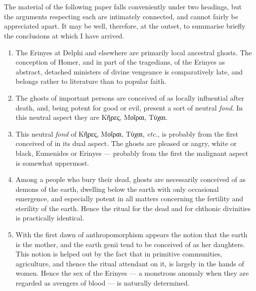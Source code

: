 \documentclass[a4paper, 11pt, oneside, polutonikogreek, english]{article}
\begin{document}
\section*{}
\paragraph{}
The material of the following paper falls conveniently under two headings, but the arguments respecting each are intimately connected, and cannot fairly be appreciated apart. It may be well, therefore, at the outset, to summarise briefly the conclusions at which I have arrived.
\begin{enumerate}
    \item The Erinyes at Delphi and elsewhere are primarily local ancestral ghosts. The conception of Homer, and in part of the tragedians, of the Erinyes as abstract, detached ministers of divine vengeance is comparatively late, and belongs rather to literature than to popular faith.

    \item The ghosts of important persons are conceived of as locally influential after death, and, being potent for good or evil, present a sort of neutral \emph{fond}. In this neutral aspect they are Κῆρες, Μοῖραι, Τύχαι.

    \item This neutral \emph{fond} of Κῆρες, Μοῖραι, Τύχαι, \emph{etc.}, is probably from the first conceived of in its dual aspect. The ghosts are pleased or angry, white or black, Eumenides or Erinyes --- probably from the first the malignant aspect is somewhat uppermost.

    \item Among a people who bury their dead, ghosts are necessarily conceived of as demons of the earth, dwelling below the earth with only occasional emergence, and especially potent in all matters concerning the fertility and sterility of the earth. Hence the ritual for the dead and for chthonic divinities is practically identical.

    \item With the first dawn of anthropomorphism appears the notion that the earth is the mother, and the earth genii tend to be conceived of as her daughters. This notion is helped out by the fact that in primitive communities, agriculture, and thence the ritual attendant on it, is largely in the hands of women. Hence the sex of the Erinyes --- a monstrous anomaly when they are regarded as avengers of blood --- is naturally determined.


\end{enumerate}
\end{document}
